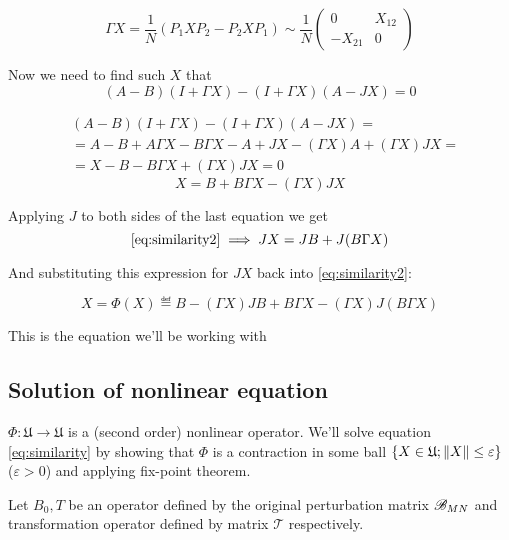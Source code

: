 \documentclass{article}
\begin{document}
\[
    \Gamma X = \frac{1}{N} (P_1 X P_2 - P_2 X P_1) \sim
    \frac{1}{N}
    \begin{pmatrix}
        0       & X_{12} \\
        -X_{21} & 0
    \end{pmatrix}
    \]

Now we need to find such \( X \) that
\begin{equation}\label{eq:similarity1}
    (A - B)(I + \Gamma X) - (I + \Gamma X)(A - JX) = 0
\end{equation}

\[\begin{aligned}
    & (A - B)(I + \Gamma X) - (I + \Gamma X)(A - JX) = \\
    & = A - B + A\Gamma X - B\Gamma X - A + JX - (\Gamma X) A + (\Gamma X) JX = \\
    & = X - B - B\Gamma X + (\Gamma X) JX = 0
\end{aligned}\]
\begin{equation}\label{eq:similarity2}
    X = B + B\Gamma X - (\Gamma X) JX
\end{equation}

Applying \( J \) to both sides of the last equation we get
\[\eqref{eq:similarity2} \implies
JX = JB + J(B\Gamma X)\]

And substituting this expression for \( JX \) back into \eqref{eq:similarity2}:

\begin{equation}\label{eq:similarity}
    X = \Phi(X) \eqdef B - (\Gamma X) JB + B\Gamma X - (\Gamma X) J(B\Gamma X)
\end{equation}

This is the equation we'll be working with

\subsection{Solution of nonlinear equation}
\( \Phi:\mathfrak U\to\mathfrak U \) is a (second order) nonlinear operator.
We'll solve equation \eqref{eq:similarity}
by showing that \( \Phi \) is a contraction in some ball \( \{ X\in \mathfrak U; \left\|{X}\right\| \leq \varepsilon \} \) (\( \varepsilon>0 \))
and applying fix-point theorem.

Let \( B_0, T \) be an operator defined by the original perturbation matrix \( \mathscr{B}_{{M}{N}} \)
and transformation operator defined by matrix \( \mathcal T \) respectively.
\end{document}
